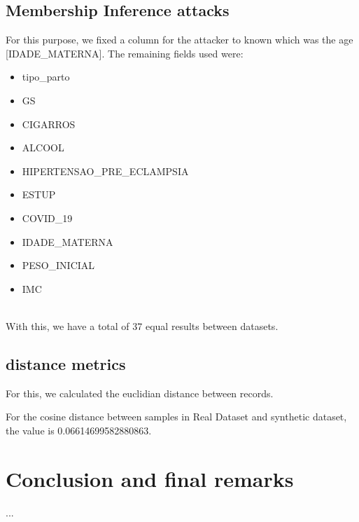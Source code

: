 \documentclass{article}
\begin{document}
\subsection{Membership Inference attacks}
For this purpose, we fixed a column for the attacker to known which was the age [IDADE\_MATERNA].
The remaining fields used were:
\begin{itemize}
 
  \item tipo\_parto
     
  \item GS
     
  \item CIGARROS
     
  \item ALCOOL
     
  \item HIPERTENSAO\_PRE\_ECLAMPSIA
     
  \item ESTUP
     
  \item COVID\_19
     
  \item IDADE\_MATERNA
     
  \item PESO\_INICIAL
     
  \item IMC
     
  \end{itemize}
\\
With this, we have a total of 37 equal results between datasets.

\subsection{distance metrics}

For this, we calculated the euclidian distance between records.

For the cosine distance between samples in Real Dataset and synthetic dataset, the value is 0.06614699582880863.



\section{Conclusion and final remarks}

...

\cleardoublepage
\printglossary[type=\acronymtype]
\cleardoublepage


\end{document}
